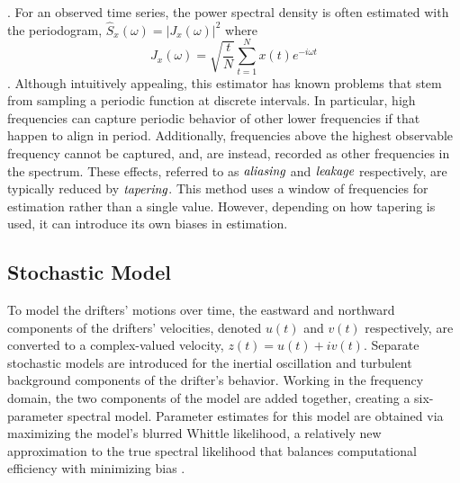 \documentclass{stat572Style}
\begin{document}
\noindent \citep{Sykulski2013}. For an observed time series, the power spectral density is often estimated with the periodogram, $\hat{S}_{x}(\omega) = |J_{x}(\omega)|^{2}$ where 
\begin{equation}
\label{eq: perio}
J_{x}(\omega) = \sqrt{\frac{t}{N}} \sum_{t=1}^{N} x(t) e^{-i \omega t}
\end{equation}
\citep{Sykulski2013}. 
Although intuitively appealing, this estimator has known problems that stem from  sampling a periodic function at discrete intervals. 
In particular,  high frequencies can  capture periodic behavior of other lower frequencies if that happen to align in period. 
Additionally, frequencies above the highest observable frequency cannot be captured, and, are instead, recorded as other frequencies in the spectrum.  
These effects, referred to as $\textbf{\it{aliasing}}$ and $\textbf{\it{leakage}}$ respectively,  are typically reduced by $\textbf{\it{tapering}}$. This method uses  a window of frequencies for estimation rather than a single value. 
However, depending on how tapering is used, it can introduce its own  biases in estimation.  


\subsection{Stochastic Model}
 To model the drifters' motions over time, the eastward and northward components of the drifters' velocities, denoted $u(t)$ and $v(t)$ respectively, are converted to a complex-valued velocity, $z(t) = u(t) + iv(t)$. 
 Separate stochastic models are introduced for the inertial oscillation and turbulent background components of the drifter's behavior. 
 Working in the frequency domain, the two components of the model are added together, creating a six-parameter spectral model. 
 Parameter estimates for this model are obtained via maximizing the model's blurred Whittle likelihood, a relatively new approximation to the true spectral likelihood that balances computational efficiency with minimizing bias \citep{Sykulski2013}. 
 
\end{document}

